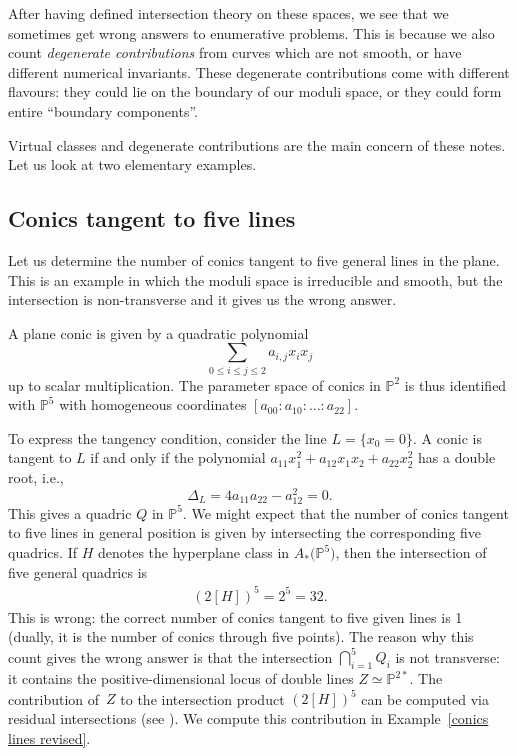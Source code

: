 \documentclass[pdftex]{sigma}
\numberwithin{equation}{section}
\theoremstyle{plain}
\theoremstyle{definition}
\theoremstyle{remark}
\begin{document}
After having defined intersection theory on these spaces, we see that we sometimes get wrong answers to enumerative problems. This is because we also count \emph{degenerate contributions} from curves which are not smooth, or have different numerical invariants. These degenerate contributions come with different flavours: they could lie on the boundary of our moduli space, or they could form entire ``boundary components''.

Virtual classes and degenerate contributions are the main concern of these notes. Let us look at two elementary examples.

\subsection{Conics tangent to five lines}\label{conics five lines} Let us determine the number of conics tangent to five general lines in the plane. This is an example in which the moduli space is irreducible and smooth, but the intersection is non-transverse and it gives us the wrong answer.

A plane conic is given by a quadratic polynomial
\[\sum_{0\leq i\leq j\leq2}a_{i,j}x_ix_j\]
up to scalar multiplication. The parameter space of conics in $\mathbb P^2$ is thus identified with $\mathbb P^5$ with homogeneous coordinates $[a_{00}:a_{10}:\dots :a_{22}]$.

To express the tangency condition, consider the line $L=\{x_0=0\}$. A conic is tangent to $L$ if and only if the polynomial $a_{11}x_1^2+a_{12}x_1x_2+a_{22}x_2^2$ has a double root, i.e.,
\[
\Delta_{L}=4a_{11}a_{22}-a_{12}^2=0.
\]
This gives a quadric $Q$ in $\mathbb P^5$. We might expect that the number of conics tangent to five lines in general position is given by intersecting the corresponding five quadrics. If $H$ denotes the hyperplane class in $A_*\big(\mathbb P^5\big)$, then the intersection of five general quadrics is \begin{gather*}(2[H])^5=2^5=32.\end{gather*} This is wrong: the correct number of conics tangent to five given lines is 1 (dually, it is the number of conics through five points). The reason why this count gives the wrong answer is that the intersection $\bigcap_{i=1}^5 Q_i$ is not transverse: it contains the positive-dimensional locus of double lines $Z\simeq \mathbb P^{2*}$. The contribution of~$Z$ to the intersection product $(2[H])^5$ can be computed via residual intersections (see \cite[Chapter~9]{Fulton}). We compute this contribution in Example~\ref{conics lines revised}.
\end{document}
